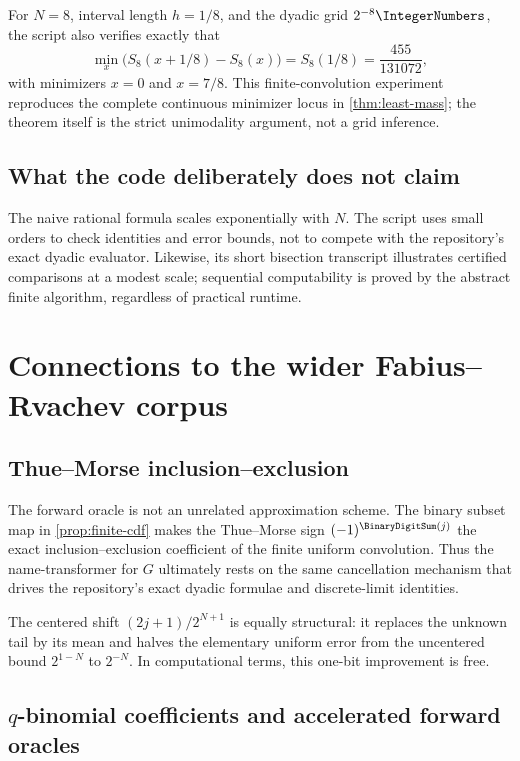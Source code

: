 \documentclass[11pt,oneside]{article}
\theoremstyle{definition}
\theoremstyle{remark}
\numberwithin{equation}{section}
\begin{document}
For $N=8$, interval length $h=1/8$, and the dyadic grid $2^{-8}\IntegerNumbers$, the script
also verifies exactly that
\[
 \min_x\bigl(S_8(x+1/8)-S_8(x)\bigr)
 =S_8(1/8)=\frac{455}{131072},
\]
with minimizers $x=0$ and $x=7/8$.  This finite-convolution experiment
reproduces the complete continuous minimizer locus in \cref{thm:least-mass};
the theorem itself is the strict unimodality argument, not a grid inference.

\subsection{What the code deliberately does not claim}

The naive rational formula scales exponentially with $N$.  The script uses
small orders to check identities and error bounds, not to compete with the
repository's exact dyadic evaluator.  Likewise, its short bisection transcript
illustrates certified comparisons at a modest scale; sequential computability
is proved by the abstract finite algorithm, regardless of practical runtime.

\section{Connections to the wider Fabius--Rvachev corpus}
\label{sec:connections}

\subsection{Thue--Morse inclusion--exclusion}

The forward oracle is not an unrelated approximation scheme.  The binary
subset map in \cref{prop:finite-cdf} makes the Thue--Morse sign
$(-1)^{\BinaryDigitSum(j)}$ the exact inclusion--exclusion coefficient of the finite
uniform convolution.  Thus the name-transformer for $G$ ultimately rests on
the same cancellation mechanism that drives the repository's exact dyadic
formulae and discrete-limit identities.

The centered shift $(2j+1)/2^{N+1}$ is equally structural: it replaces the
unknown tail by its mean and halves the elementary uniform error from the
uncentered bound $2^{1-N}$ to $2^{-N}$.  In computational terms, this one-bit
improvement is free.

\subsection{\texorpdfstring{$q$}{q}-binomial coefficients and accelerated forward oracles}
\end{document}
